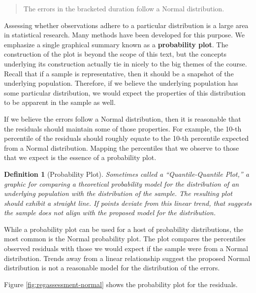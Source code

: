 \documentclass[
]{book}
\theoremstyle{plain}
\theoremstyle{mydefn}
\newtheorem{definition}{Definition}[chapter]
\theoremstyle{myexmpl}
\theoremstyle{remark}
\begin{document}
\begin{quote}
The errors in the bracketed duration follow a Normal distribution.
\end{quote}

Assessing whether observations adhere to a particular distribution is a large area in statistical research. Many methods have been developed for this purpose. We emphasize a single graphical summary known as a \textbf{probability plot}. The construction of the plot is beyond the scope of this text, but the concepts underlying its construction actually tie in nicely to the big themes of the course. Recall that if a sample is representative, then it should be a snapshot of the underlying population. Therefore, if we believe the underlying population has some particular distribution, we would expect the properties of this distribution to be apparent in the sample as well.

If we believe the errors follow a Normal distribution, then it is reasonable that the residuals should maintain some of those properties. For example, the 10-th percentile of the residuals should roughly equate to the 10-th percentile expected from a Normal distribution. Mapping the percentiles that we observe to those that we expect is the essence of a probability plot.

\begin{definition}[Probability Plot]
\protect\hypertarget{def:defn-probability-plot}{}{\label{def:defn-probability-plot} {} }Sometimes called a ``Quantile-Quantile Plot,'' a graphic for comparing a theoretical probability model for the distribution of an underlying population with the distribution of the sample. The resulting plot should exhibit a straight line. If points deviate from this linear trend, that suggests the sample does not align with the proposed model for the distribution.
\end{definition}

While a probability plot can be used for a host of probability distributions, the most common is the Normal probability plot. The plot compares the percentiles observed residuals with those we would expect if the sample were from a Normal distribution. Trends away from a linear relationship suggest the proposed Normal distribution is not a reasonable model for the distribution of the errors.

Figure \ref{fig:regassessment-normal} shows the probability plot for the residuals.
\end{document}
